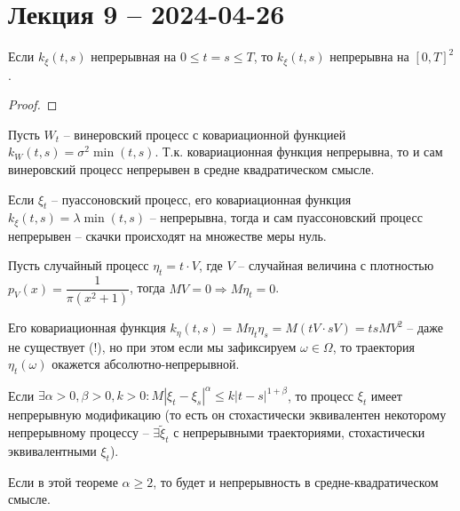 \section{Лекция 9 -- 2024-04-26 }


\begin{theorem}
  Если $k_\xi(t,s)$ непрерывная на $0 \leqslant t = s \leqslant T$, то
  $k_\xi(t, s)$ непрерывна на $[0, T]^2$.
\end{theorem}
\begin{proof}
\end{proof}

\begin{ex}
  Пусть $W_t$ -- винеровский процесс  с ковариационной функцией $k_W(t, s) = \sigma^2 \min(t, s)$.
  Т.к. ковариационная функция непрерывна, то и сам винеровский процесс непрерывен в 
  средне квадратическом смысле.
\end{ex}

\begin{ex}
  Если $\xi_t$ -- пуассоновский процесс, его ковариационная функция $k_\xi(t, s) = \lambda \min(t, s)$ -- непрерывна, тогда и сам пуассоновский процесс непрерывен -- скачки происходят на множестве
  меры нуль.
\end{ex}

\begin{ex}
  Пусть случайный процесс $\eta_t  = t \cdot V$, где $V$ -- случайная величина с плотностью
  $p_V(x) = \dfrac{1}{\pi (x^2 + 1)}$, тогда $MV = 0 \Rightarrow M\eta_t = 0$.

  Его ковариационная функция $k_\eta (t, s) = M\eta_t \eta_s = M(t V \cdot s V) = ts MV^2$ --
  даже не существует (!), но при этом если мы зафиксируем $\omega \in \Omega$, 
  то траектория $\eta_t (\omega)$ окажется абсолютно-непрерывной.
\end{ex}

\begin{theorem}[Колмогорова]
  Если $\exists \alpha > 0, \beta > 0, k>0 : M|\xi_t - \xi_s|^\alpha \leqslant k |t-s|^{1+\beta}$,
  то процесс $\xi_t$ имеет непрерывную модификацию (то есть он стохастически эквивалентен
  некоторому непрерывному процессу -- $\exists \tilde \xi_t$ с непрерывными траекториями,
  стохастически эквивалентными $\xi_t$).
\end{theorem}

Если в этой теореме $\alpha \geqslant 2$, то будет и непрерывность в средне-квадратическом смысле.

